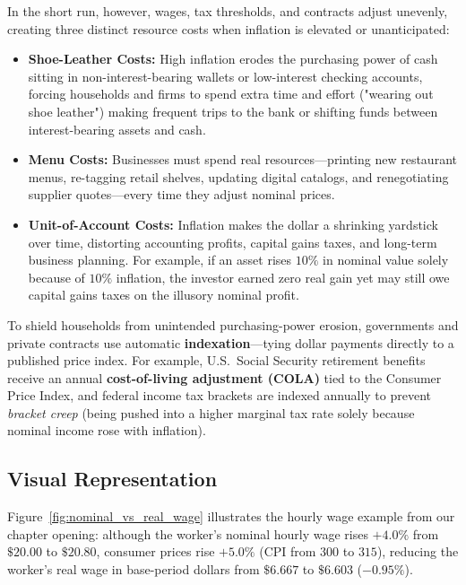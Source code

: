 \documentclass[11pt,letterpaper]{article}
\begin{document}
In the short run, however, wages, tax thresholds, and contracts adjust unevenly, creating three distinct resource costs when inflation is elevated or unanticipated:
\begin{itemize}
    \item \textbf{Shoe-Leather Costs:} High inflation erodes the purchasing power of cash sitting in non-interest-bearing wallets or low-interest checking accounts, forcing households and firms to spend extra time and effort ("wearing out shoe leather") making frequent trips to the bank or shifting funds between interest-bearing assets and cash.
    \item \textbf{Menu Costs:} Businesses must spend real resources—printing new restaurant menus, re-tagging retail shelves, updating digital catalogs, and renegotiating supplier quotes—every time they adjust nominal prices.
    \item \textbf{Unit-of-Account Costs:} Inflation makes the dollar a shrinking yardstick over time, distorting accounting profits, capital gains taxes, and long-term business planning. For example, if an asset rises $10\%$ in nominal value solely because of $10\%$ inflation, the investor earned zero real gain yet may still owe capital gains taxes on the illusory nominal profit.
\end{itemize}

To shield households from unintended purchasing-power erosion, governments and private contracts use automatic \textbf{indexation}—tying dollar payments directly to a published price index. For example, U.S.\ Social Security retirement benefits receive an annual \textbf{cost-of-living adjustment (COLA)} tied to the Consumer Price Index, and federal income tax brackets are indexed annually to prevent \emph{bracket creep} (being pushed into a higher marginal tax rate solely because nominal income rose with inflation).

\subsection*{Visual Representation}
Figure~\ref{fig:nominal_vs_real_wage} illustrates the hourly wage example from our chapter opening: although the worker's nominal hourly wage rises $+4.0\%$ from $\$20.00$ to $\$20.80$, consumer prices rise $+5.0\%$ ($\text{CPI}$ from $300$ to $315$), reducing the worker's real wage in base-period dollars from $\$6.667$ to $\$6.603$ ($-0.95\%$).
\end{document}
